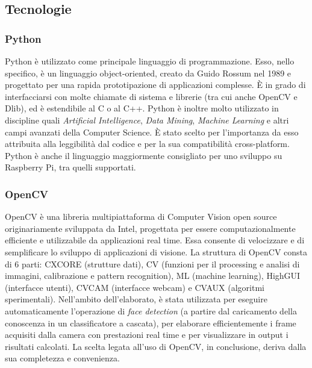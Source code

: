 \documentclass[12pt]{article}
\begin{document}
\subsection{Tecnologie}

\subsubsection{Python}
Python è utilizzato come principale linguaggio di programmazione. Esso, nello specifico, è un linguaggio object-oriented, creato da Guido Rossum nel 1989 e progettato per una rapida prototipazione di applicazioni complesse. È in grado di interfacciarsi con molte chiamate di sistema e librerie (tra cui anche OpenCV e Dlib), ed è estendibile al C o al C++. Python è inoltre molto utilizzato in discipline quali \textit{Artificial Intelligence}, \textit{Data Mining}, \textit{Machine Learning} e altri campi avanzati della Computer Science. È stato scelto per l'importanza da esso attribuita alla leggibilità dal codice e per la sua compatibilità cross-platform. Python è anche il linguaggio maggiormente consigliato per uno sviluppo su Raspberry Pi, tra quelli supportati.

\subsubsection{OpenCV}
\label{subsec:opencv}
OpenCV\cite{OpenCV} è una libreria multipiattaforma di Computer Vision open source originariamente sviluppata da Intel, progettata per essere computazionalmente efficiente e utilizzabile da applicazioni real time. Essa consente di velocizzare e di semplificare lo sviluppo di applicazioni di visione. La struttura di OpenCV consta di 6 parti: CXCORE (strutture dati), CV (funzioni per il processing e analisi di immagini, calibrazione e pattern recognition), ML (machine learning), HighGUI (interfacce utenti), CVCAM (interfacce webcam) e CVAUX (algoritmi sperimentali). Nell'ambito dell'elaborato, è stata utilizzata per eseguire automaticamente l'operazione di \textit{face detection} (a partire dal caricamento della conoscenza in un classificatore a cascata), per elaborare efficientemente i frame acquisiti dalla camera con prestazioni real time e per visualizzare in output i risultati calcolati. La scelta legata all'uso di OpenCV, in conclusione, deriva dalla sua completezza e convenienza.
\end{document}
